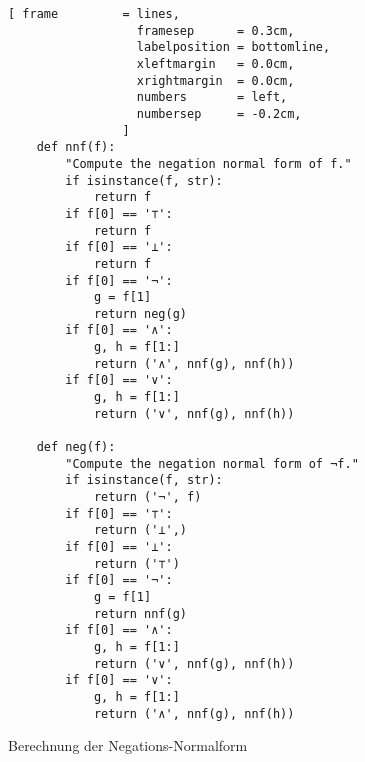 \begin{figure}[!ht]
  \centering
\begin{Verbatim}[ frame         = lines, 
                  framesep      = 0.3cm, 
                  labelposition = bottomline,
                  xleftmargin   = 0.0cm,
                  xrightmargin  = 0.0cm,
                  numbers       = left,
                  numbersep     = -0.2cm,
                ]
    def nnf(f):
        "Compute the negation normal form of f."
        if isinstance(f, str): 
            return f
        if f[0] == '⊤':
            return f
        if f[0] == '⊥':
            return f
        if f[0] == '¬':
            g = f[1]
            return neg(g)
        if f[0] == '∧':
            g, h = f[1:]
            return ('∧', nnf(g), nnf(h))
        if f[0] == '∨':
            g, h = f[1:]
            return ('∨', nnf(g), nnf(h))
    
    def neg(f):
        "Compute the negation normal form of ¬f."
        if isinstance(f, str): 
            return ('¬', f)
        if f[0] == '⊤':
            return ('⊥',)
        if f[0] == '⊥':
            return ('⊤')
        if f[0] == '¬':
            g = f[1]
            return nnf(g)
        if f[0] == '∧':
            g, h = f[1:]
            return ('∨', nnf(g), nnf(h))
        if f[0] == '∨':
            g, h = f[1:]
            return ('∧', nnf(g), nnf(h))
\end{Verbatim}
\vspace*{-0.3cm}
  \caption{Berechnung der Negations-Normalform}
  \label{fig:nnf}
\end{figure}
\pagebreak


